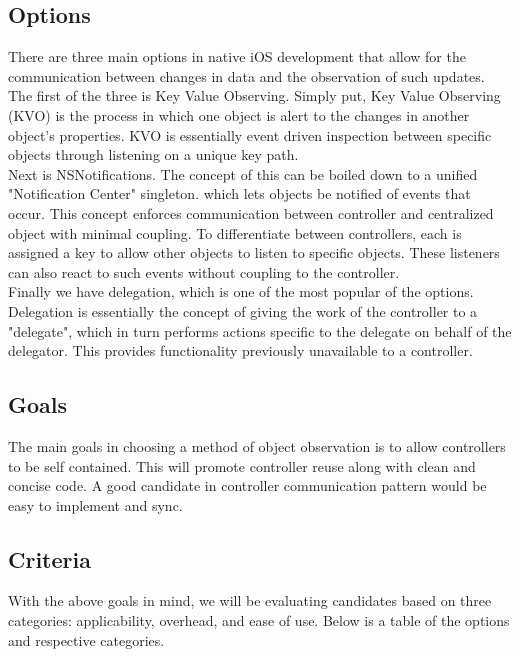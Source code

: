 \documentclass[letterpaper,10pt,titlepage]{article}
\begin{document}
\subsection{Options}

There are three main options in native iOS development that allow for the communication between changes in data and the observation of such updates. The first of the three is Key Value Observing. Simply put, Key Value Observing (KVO) is the process in which one object is alert to the changes in another object's properties.\cite{observation2} KVO is essentially event driven inspection between specific objects through listening on a unique key path.\\

Next is NSNotifications. The concept of this can be boiled down to a unified "Notification Center" singleton. which lets objects be notified of events that occur.\cite{observation1} This concept enforces communication between controller and centralized object with minimal coupling. To differentiate between controllers, each is assigned a key to allow other objects to listen to specific objects. These listeners can also react to such events without coupling to the controller.\\

Finally we have delegation, which is one of the most popular of the options. Delegation is essentially the concept of giving the work of the controller to a "delegate", which in turn performs actions specific to the delegate on behalf of the delegator.\cite{observation3} This provides functionality previously unavailable to a controller.

\subsection{Goals}

The main goals in choosing a method of object observation is to allow controllers to be self contained. This will promote controller reuse along with clean and concise code. A good candidate in controller communication pattern would be easy to implement and sync.

\subsection{Criteria}

With the above goals in mind, we will be evaluating candidates based on three categories: applicability, overhead, and ease of use. Below is a table of the options and respective categories.
\end{document}
